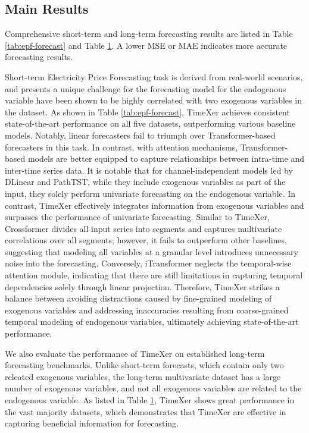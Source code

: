 \documentclass[nohyperref]{article}
\theoremstyle{plain}
\theoremstyle{definition}
\theoremstyle{remark}
\begin{document}
\begin{table}[h]
\begin{sc}
{\begin{tabular}{c|cc|cc|cc|cc|cc|cc|cc|cc|cc|cc|cc}
\end{tabular}}
\end{sc}
\label{tab:multi-result}
\vspace{-10pt}
\end{table}




\subsection{Main Results}
Comprehensive short-term and long-term forecasting results are listed in Table \ref{tab:epf-forecast} and Table \ref{tab:multi-result}. A lower MSE or MAE indicates more accurate forecasting results.

Short-term Electricity Price Forecasting task is derived from real-world scenarios, and presents a unique challenge for the forecasting model for the endogenous variable have been shown to be highly correlated with two exogenous variables in the dataset. As shown in Table \ref{tab:epf-forecast}, TimeXer achieves consistent state-of-the-art performance on all five datasets, outperforming various baseline models. Notably, linear forecasters fail to triumph over Transformer-based forecasters in this task.
In contrast, with attention mechanisms, Transformer-based models are better equipped to capture relationships between intra-time and inter-time series data.
It is notable that for channel-independent models led by DLinear and PathTST, while they include exogenous variables as part of the input, they solely perform univariate forecasting on the endogenous variable. In contrast, TimeXer effectively integrates information from exogenous variables and surpasses the performance of univariate forecasting. Similar to TimeXer, Crossformer divides all input series into segments and captures multivariate correlations over all segments; however, it fails to outperform other baselines, suggesting that modeling all variables at a granular level introduces unnecessary noise into the forecasting. Conversely, iTransformer neglects the temporal-wise attention module, indicating that there are still limitations in capturing temporal dependencies solely through linear projection. Therefore, TimeXer strikes a balance between avoiding distractions caused by fine-grained modeling of exogenous variables and addressing inaccuracies resulting from coarse-grained temporal modeling of endogenous variables, ultimately achieving state-of-the-art performance.

We also evaluate the performance of TimeXer on established long-term forecasting benchmarks. Unlike short-term forecasts, which contain only two releated exogenous variables, the long-term multivariate dataset has a large number of exogenous variables, and not all exogenous variables are related to the endogenous variable.
As listed in Table \ref{tab:multi-result}, TimeXer shows great performance in the vast majority datasets, which demonstrates that TimeXer are effective in capturing beneficial information for forecasting.
\end{document}
